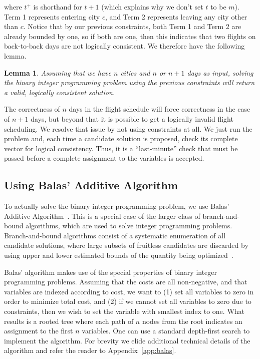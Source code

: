 \documentclass{article}
\newtheorem{lem}[thm]{Lemma}
\begin{document}
where $t^+$ is shorthand for $t+1$ (which explains why we don't set $t$ to be $m$). Term 1 represents entering city $c$, and Term 2 represents leaving
any city other than $c$. Notice that by our previous constraints, both Term 1 and Term 2 are already bounded by one, so if both are one, then this
indicates that two flights on back-to-back days are not logically consistent. We therefore have the following lemma.

\begin{lem}\label{lem:correctness}
Assuming that we have $n$ cities and $n$ or $n+1$ days as input, solving the binary integer programming problem using the previous constraints will return a
valid, logically consistent solution.
\end{lem}

The correctness of $n$ days in the flight schedule will force correctness in the case of $n+1$ days, but beyond that it is possible to get a logically
invalid flight scheduling. We resolve that issue by not using constraints at all. We just run the problem and, each time a candidate solution is
proposed, check its complete vector for logical consistency.  Thus, it is a ``last-minute'' check that must be passed before a complete assignment to
the variables is accepted.

\subsection{Using Balas' Additive Algorithm}\label{sec:balas}

To actually solve the binary integer programming problem, we use Balas' Additive Algorithm~\cite{doi:10.1287/opre.13.4.517}. This is a special case of
the larger class of branch-and-bound algorithms, which are used to solve integer programming problems. Branch-and-bound algorithms consist of a
systematic enumeration of all candidate solutions, where large subsets of fruitless candidates are discarded by using upper and lower estimated bounds
of the quantity being optimized~\cite{Clausen1997}.

Balas' algorithm makes use of the special properties of binary integer programming problems. Assuming that the costs are all non-negative, and that
variables are indexed according to cost, we want to (1) set all variables to zero in order to minimize total cost, and (2) if we cannot set all
variables to zero due to constraints, then we wish to set the variable with smallest index to one. What results is a rooted tree where each path of
$n$ nodes from the root indicates an assignment to the first $n$ variables. One can use a standard depth-first search to implement the algorithm.  For
brevity we elide additional technical details of the algorithm and refer the reader to Appendix~\ref{app:balas}.
\end{document}
